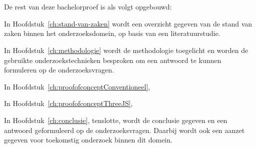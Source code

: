 \section{}%
\label{sec:opzet-bachelorproef}

De rest van deze bachelorproef is als volgt opgebouwd:

In Hoofdstuk~\ref{ch:stand-van-zaken} wordt een overzicht gegeven van de stand van zaken binnen het onderzoeksdomein, op basis van een literatuurstudie.

In Hoofdstuk~\ref{ch:methodologie} wordt de methodologie toegelicht en worden de gebruikte onderzoekstechnieken besproken om een antwoord te kunnen formuleren op de onderzoeksvragen.



In Hoofdstuk~\ref{ch:proofofconceptConventioneel}, 

In Hoofdstuk~\ref{ch:proofofconceptThreeJS}, 

In Hoofdstuk~\ref{ch:conclusie}, tenslotte, wordt de conclusie gegeven en een antwoord geformuleerd op de onderzoeksvragen. Daarbij wordt ook een aanzet gegeven voor toekomstig onderzoek binnen dit domein.